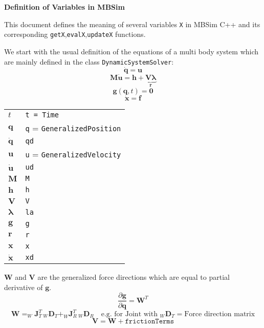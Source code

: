 \documentclass{report}
\newcommand{\bs}[1]{\boldsymbol #1}
\begin{document}
\textbf{\Large{Definition of Variables in MBSim}}



\vspace{4em}
This document defines the meaning of several variables \texttt{X} in MBSim C++ and its corresponding \texttt{getX},\texttt{evalX},\texttt{updateX} functions.


\vspace{3em}
We start with the usual definition of the equations of a multi body system which are mainly defined in the class \texttt{DynamicSystemSolver}:
\begin{equation}
  \dot{\bs{q}}=\bs{u}
\end{equation}
\begin{equation}
  \bs{M}\dot{\bs{u}}=\bs{h}+\underbrace{\bs{V}\bs{\lambda}}_{\bs{r}}
  \label{M}
\end{equation}
\begin{equation}
  \bs{g}(\bs{q},t)=\bs{0}
\end{equation}
\begin{equation}
  \dot{\bs{x}}=\bs{f}
\end{equation}

\begin{tabular}{|l|l|}
  \hline
  $t$ & \texttt{t = Time} \\
  $\bs{q}$ & \texttt{q} = \texttt{GeneralizedPosition} \\
  $\dot{\bs{q}}$ & \texttt{qd} \\
  $\bs{u}$ & \texttt{u} = \texttt{GeneralizedVelocity} \\
  $\dot{\bs{u}}$ & \texttt{ud} \\
  $\bs{M}$ & \texttt{M} \\
  $\bs{h}$ & \texttt{h} \\
  $\bs{V}$ & \texttt{V} \\
  $\bs{\lambda}$ & \texttt{la} \\
  $\bs{g}$ & \texttt{g} \\
  $\bs{r}$ & \texttt{r} \\
  $\bs{x}$ & \texttt{x} \\
  $\dot{\bs{x}}$ & \texttt{xd} \\
  \hline
\end{tabular}

$\bs{W}$ and $\bs{V}$ are the generalized force directions which are equal to partial derivative of $\bs{g}$.
\begin{equation}
  \frac{\partial \bs{g}}{\partial \bs{q}}=\bs{W}^T
\end{equation}
\begin{equation}
  \bs{W}=_W\bs{J}_T^T\,_W\bs{D}_T+_W\bs{J}_R^T\,_W\bs{D}_R \quad\text{e.g. for Joint with $_W\bs{D}_T=$Force direction matrix}
\end{equation}
\begin{equation}
  \bs{V}=\bs{W} + \texttt{frictionTerms}
\end{equation}
\end{document}
